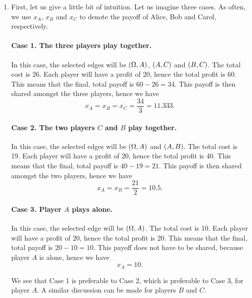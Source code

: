 \begin{enumerate} [label=\alph*.]
	\item First, let us give a little bit of intuition.
	Let us imagine three cases. As often, we use $x_{A}$, $x_{B}$ and $x_{C}$ to denote the payoff of Alice, Bob and Carol, respectively.
	
	\paragraph{Case 1. The three players play together.}
	In this case, the selected edges will be $\left(\Omega, A\right)$, $\left(A, C\right)$ and $\left(B, C\right)$. The total cost is 26. Each player will have a profit of 20, hence the total profit is 60. This means that the final, total payoff is $60 - 26 = 34$. This payoff is then shared amongst the three players, hence we have
	\begin{equation*}
	    x_{A} = x_{B} = x_{C} = \dfrac{34}{3} = 11.333.
	\end{equation*}
	
	\paragraph{Case 2. The two players $C$ and $B$ play together.}
	In this case, the selected edges will be $\left(\Omega, A\right)$ and $\left(A, B\right)$. The total cost is 19. Each player will have a profit of 20, hence the total profit is 40. This means that the final, total payoff is $40 - 19 = 21$. This payoff is then shared amongst the two players, hence we have
	\begin{equation*}
	    x_{A} = x_{B} = \dfrac{21}{2} = 10.5.
	\end{equation*}
	
	
	\paragraph{Case 3. Player $A$ plays alone.}
	In this case, the selected edge will be $\left(\Omega, A\right)$. The total cost is 10. Each player will have a profit of 20, hence the total profit is 20. This means that the final, total payoff is $20 - 10 = 10$. This payoff does not have to be shared, because player $A$ is alone, hence we have
	\begin{equation*}
	    x_{A} = 10.
	\end{equation*}
	
	We see that Case 1 is preferable to Case 2, which is preferable to Case 3, for player $A$. A similar discussion can be made for players $B$ and $C$. 
	

\end{enumerate}
